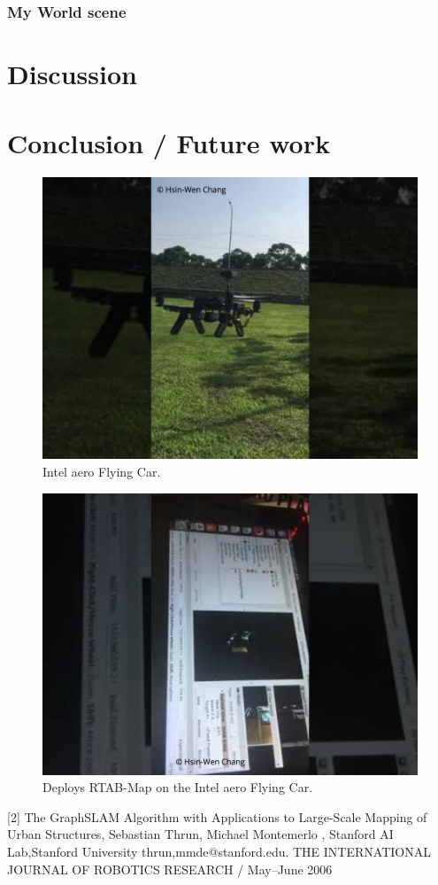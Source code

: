 \documentclass[10pt,journal,compsoc]{IEEEtran}
\begin{document}
\subsubsection{My World scene}

\section{Discussion}


\section{Conclusion / Future work}

\begin{figure}[thpb]
      \centering
      \includegraphics[width=\linewidth]{aero.jpeg}
      \caption{Intel aero Flying Car.}
      \label{fig:robot1}
\end{figure}
\begin{figure}[thpb]
      \centering
      \includegraphics[width=\linewidth]{RTAB-Map.jpeg}
      \caption{Deploys RTAB-Map on the Intel aero Flying Car.}
      \label{fig:robot1}
\end{figure}



[2] The GraphSLAM Algorithm with Applications to Large-Scale Mapping of Urban Structures, Sebastian Thrun, Michael Montemerlo
, Stanford AI Lab,Stanford University {thrun,mmde}@stanford.edu. THE INTERNATIONAL JOURNAL OF ROBOTICS RESEARCH / May–June 2006
\end{document}
